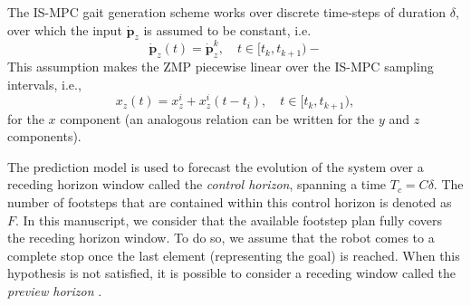 The IS-MPC gait generation scheme works over discrete time-steps of duration
$\delta$, over which the input $\dot{\bm{p}}_z$ is assumed to be constant, i.e.
\begin{equation*}
    \dot{\bm{p}}_z(t) = \dot{\bm{p}}_z^k,\quad t \in [t_k, t_{k+1})-
\end{equation*}
This assumption makes the ZMP piecewise linear over the IS-MPC sampling intervals,
i.e.,
\begin{equation}
    \label{eq:piecewise-linear-ZMP}
    x_z(t) = x_z^i + x_z^i (t - t_i), \quad t \in [t_k, t_{k+1}),
\end{equation}
for the $x$ component (an analogous relation can be written for the $y$ and $z$
components).

The prediction model is used to forecast the
evolution of the system over a receding horizon window called the
\textit{control horizon}, spanning a time $T_c=C\delta$.
The number of footsteps that are contained
within this control horizon is denoted as $F$. In this manuscript, we consider
that the available footstep plan fully covers the receding horizon window. To
do so, we assume that the robot comes to a complete stop once the
last element (representing the goal) is reached.
When this hypothesis is not satisfied, it is possible to consider a 
receding window called the \textit{preview horizon} \cite{Scianca2020TRO}.

